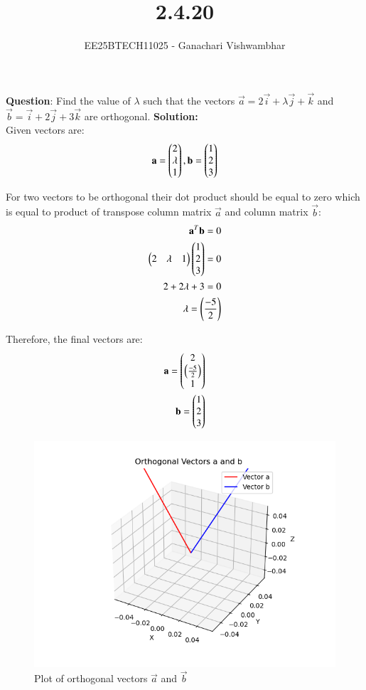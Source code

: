 \documentclass[journal]{IEEEtran}
\begin{document}
\title{2.4.20}
\author{EE25BTECH11025 - Ganachari Vishwambhar}
\maketitle

\textbf{Question}:\newline
Find the value of $\lambda$ such that the vectors $\vec{a}=2\vec{i}+\lambda\vec{j}+\vec{k}$ and $\vec{b}=\vec{i}+2\vec{j}+3\vec{k}$ are orthogonal.
\textbf{Solution: }\\
Given vectors are:
\begin{align}
    \mathbf{a}=\begin{pmatrix}2\\\lambda\\1\end{pmatrix},
    \mathbf{b}=\begin{pmatrix}1\\2\\3\end{pmatrix}
\end{align}

For two vectors to be orthogonal their dot product should be equal to zero which is equal to product of transpose column matrix $\vec{a}$ and column matrix $\vec{b}$:
\begin{align}
    \mathbf{a}^T\mathbf{b}=0\\
    \begin{pmatrix}2&\lambda&1\end{pmatrix}\begin{pmatrix}1\\2\\3\end{pmatrix}=0\\
    2+2\lambda+3=0\\
    \lambda=\left(\frac{-5}{2}\right)
\end{align}

Therefore, the final vectors are:
\begin{align}
    \mathbf{a}=\begin{pmatrix}2\\\left(\frac{-5}{2}\right)\\1\end{pmatrix}\\
    \mathbf{b}=\begin{pmatrix}1\\2\\3\end{pmatrix}
\end{align}

\begin{figure}[h!]
   \centering
   \includegraphics[width=0.7\linewidth]{figs/plot.png}
   \caption{Plot of orthogonal vectors $\vec{a}$ and $\vec{b}$}
   \label{}
\end{figure}
\end{document}
